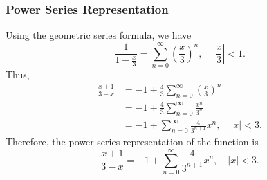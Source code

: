 \subsubsection{Power Series Representation}
Using the geometric series formula, we have
\[
\frac{1}{1 - \frac{x}{3}} = \sum_{n=0}^{\infty} \left( \frac{x}{3} \right)^n, \quad \left| \frac{x}{3} \right| < 1.
\]
Thus,
\begin{align*}
\frac{x + 1}{3 - x} &= -1 + \frac{4}{3} \sum_{n=0}^{\infty} \left( \frac{x}{3} \right)^n \\
&= -1 + \frac{4}{3} \sum_{n=0}^{\infty} \frac{x^n}{3^n} \\
&= -1 + \sum_{n=0}^{\infty} \frac{4}{3^{n+1}} x^n, \quad |x| < 3.
\end{align*}
Therefore, the power series representation of the function is
\[
\frac{x + 1}{3 - x} = -1 + \sum_{n=0}^{\infty} \frac{4}{3^{n+1}} x^n, \quad |x| < 3.
\]

\newpage